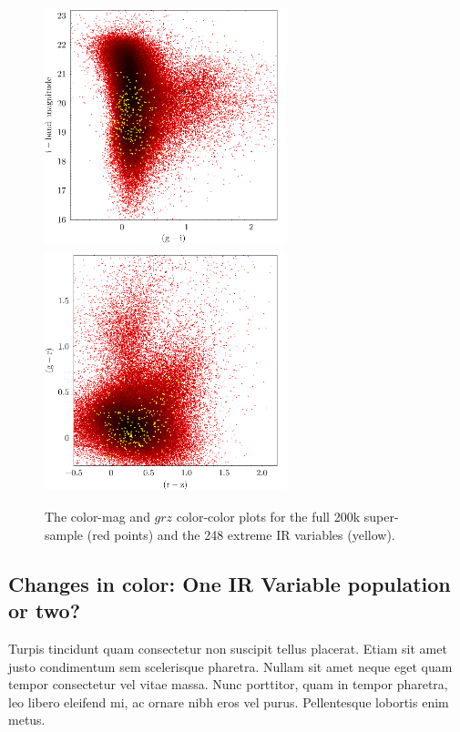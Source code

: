 \documentclass{emulateapj}
\begin{document}
    \begin{figure}
      \includegraphics[width=7.00cm, height=7.00cm, trim=0.0cm 0.0cm 0.0cm 0.0cm, clip]
      {../color_color/colormag_gr_imag_topcat.png}
      \includegraphics[width=7.00cm, height=7.00cm, trim=0.0cm 0.0cm 0.0cm 0.0cm, clip]
      {../color_color/colormag_grz_topcat.png}
      \centering
      \caption[]{The color-mag and $grz$ color-color plots for the full 200k super-sample (red points) 
        and the 248 extreme IR variables (yellow).}
      \label{fig:grz_colorcolor}
    \end{figure}

    \subsection{Changes in color: One IR Variable population or two?}
    Turpis tincidunt quam consectetur non suscipit tellus placerat. Etiam
    sit amet justo condimentum sem scelerisque pharetra. Nullam sit amet
    neque eget quam tempor consectetur vel vitae massa. Nunc porttitor,
    quam in tempor pharetra, leo libero eleifend mi, ac ornare nibh eros
    vel purus. Pellentesque lobortis enim metus.
\end{document}
